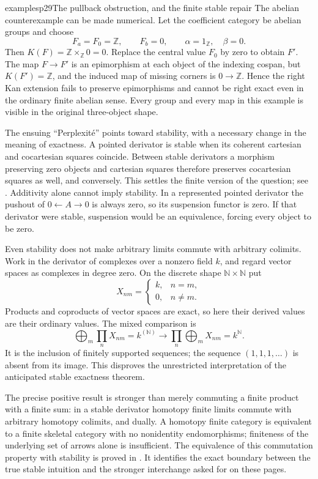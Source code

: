 \begin{dcomment}{examples}{p29}{The pullback obstruction, and the finite stable repair}
The abelian counterexample can be made numerical. Let the coefficient
category be abelian groups and choose
\[
 F_a=F_0=\mathbb Z,\qquad F_b=0,\qquad
 \alpha=1_{\mathbb Z},\quad\beta=0.
\]
Then $K(F)=\mathbb Z\times_{\mathbb Z}0=0$. Replace the central value
$F_0$ by zero to obtain $F'$. The map $F\to F'$ is an epimorphism at
each object of the indexing cospan, but $K(F')=\mathbb Z$, and the
induced map of missing corners is $0\to\mathbb Z$. Hence the right Kan
extension fails to preserve epimorphisms and cannot be right exact even
in the ordinary finite abelian sense. Every group and every map in this
example is visible in the original three-object shape.

The ensuing ``Perplexit\'e'' points toward stability, with a necessary
change in the meaning of exactness. A pointed derivator is stable when
its coherent cartesian and cocartesian squares coincide. Between stable
derivators a morphism preserving zero objects and cartesian squares
therefore preserves cocartesian squares as well, and conversely. This
settles the finite version of the question; see
\citet[Definition~3.15 and Corollary~4.17]{Groth2013}. Additivity alone
cannot imply stability. In a represented pointed derivator the pushout
of $0\leftarrow A\to0$ is always zero, so its suspension functor is
zero. If that derivator were stable, suspension would be an equivalence,
forcing every object to be zero.

Even stability does not make arbitrary limits commute with arbitrary
colimits. Work in the derivator of complexes over a nonzero field $k$,
and regard vector spaces as complexes in degree zero. On the discrete
shape $\mathbb N\times\mathbb N$ put
\[
 X_{nm}=\begin{cases}k,&n=m,\\0,&n\ne m.\end{cases}
\]
Products and coproducts of vector spaces are exact, so here their derived
values are their ordinary values. The mixed comparison is
\[
 \bigoplus_m\prod_nX_{nm}=k^{(\mathbb N)}
 \longrightarrow
 \prod_n\bigoplus_mX_{nm}=k^{\mathbb N}.
\]
It is the inclusion of finitely supported sequences; the sequence
$(1,1,1,\ldots)$ is absent from its image. This disproves the unrestricted
interpretation of the anticipated stable exactness theorem.

The precise positive result is stronger than merely commuting a finite
product with a finite sum: in a stable derivator homotopy finite limits
commute with arbitrary homotopy colimits, and dually. A homotopy finite
category is equivalent to a finite skeletal category with no
nonidentity endomorphisms; finiteness of the underlying set of arrows
alone is insufficient. The equivalence of this commutation property
with stability is proved in
\citet[Theorem~2.14]{GrothShulman2017}. It identifies the exact boundary
between the true stable intuition and the stronger interchange asked
for on these pages.
\end{dcomment}



